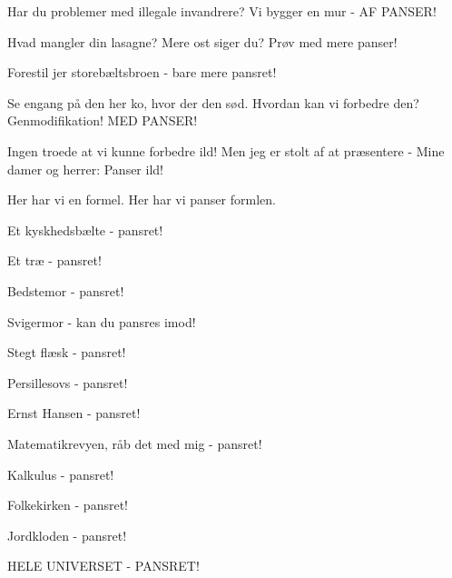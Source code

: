 \documentclass[a4paper,11pt]{article}
\begin{document}
\begin{sketch}
 Har du problemer med illegale invandrere? Vi bygger en mur - AF PANSER!

 Hvad mangler din lasagne? Mere ost siger du? Prøv med mere panser!

 Forestil jer storebæltsbroen - bare mere pansret!

 Se engang på den her ko, hvor der den sød. Hvordan kan vi forbedre den? Genmodifikation!  MED PANSER!

 Ingen troede at vi kunne forbedre ild! Men jeg er stolt af at præsentere - Mine damer og herrer: Panser ild!

 Her har vi en formel. Her har vi panser formlen. 

 Et kyskhedsbælte - pansret! 

 Et træ - pansret!

 Bedstemor - pansret!

 Svigermor - kan du pansres imod! 

 Stegt flæsk - pansret! 

 Persillesovs - pansret! 

 Ernst Hansen - pansret! 

 Matematikrevyen, råb det med mig - pansret!


 Kalkulus - pansret! 

 Folkekirken - pansret! 

 Jordkloden - pansret! 

 HELE UNIVERSET - PANSRET!


\end{sketch}
\end{document}

